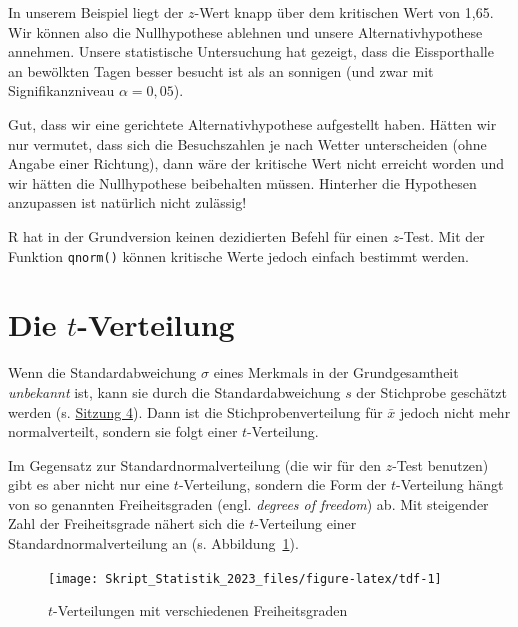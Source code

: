 \documentclass[
  11pt,
  ngerman,
  a4paper,
]{report}
\newenvironment{rtip}{
  \medskip
  \begin{tcolorbox}[colframe=purple,colback=light_gray,title=Softwarehinweis]
}{
  \end{tcolorbox}
  \medskip
}
\begin{document}
In unserem Beispiel liegt der \(z\)-Wert knapp über dem kritischen Wert von 1,65. Wir können also die Nullhypothese ablehnen und unsere Alternativhypothese annehmen. Unsere statistische Untersuchung hat gezeigt, dass die Eissporthalle an bewölkten Tagen besser besucht ist als an sonnigen (und zwar mit Signifikanzniveau \(\alpha=0,05\)).

Gut, dass wir eine gerichtete Alternativhypothese aufgestellt haben. Hätten wir nur vermutet, dass sich die Besuchszahlen je nach Wetter unterscheiden (ohne Angabe einer Richtung), dann wäre der kritische Wert nicht erreicht worden und wir hätten die Nullhypothese beibehalten müssen. Hinterher die Hypothesen anzupassen ist natürlich nicht zulässig!

\begin{rtip}
R hat in der Grundversion keinen dezidierten Befehl für einen $z$-Test. Mit der Funktion \verb|qnorm()| können kritische Werte jedoch einfach bestimmt werden.
\end{rtip}

\hypertarget{t-verteilung}{%
\section{\texorpdfstring{Die \(t\)-Verteilung}{Die t-Verteilung}}\label{t-verteilung}}

Wenn die Standardabweichung \(\sigma\) eines Merkmals in der Grundgesamtheit \emph{unbekannt} ist, kann sie durch die Standardabweichung \(s\) der Stichprobe geschätzt werden (s. \href{schätzstatistik-1.html}{Sitzung 4}). Dann ist die Stichprobenverteilung für \(\bar{x}\) jedoch nicht mehr normalverteilt, sondern sie folgt einer \(t\)-Verteilung.

Im Gegensatz zur Standardnormalverteilung (die wir für den \(z\)-Test benutzen) gibt es aber nicht nur eine \(t\)-Verteilung, sondern die Form der \(t\)-Verteilung hängt von so genannten Freiheitsgraden (engl. \emph{degrees of freedom}) ab. Mit steigender Zahl der Freiheitsgrade nähert sich die \(t\)-Verteilung einer Standardnormalverteilung an (s. Abbildung~\ref{fig:tdf}).

\begin{figure}[!h]

{\centering \texttt{[image: Skript\_Statistik\_2023\_files/figure-latex/tdf-1]} 

}

\caption{$t$-Verteilungen mit verschiedenen Freiheitsgraden}\label{fig:tdf}
\end{figure}
\end{document}

